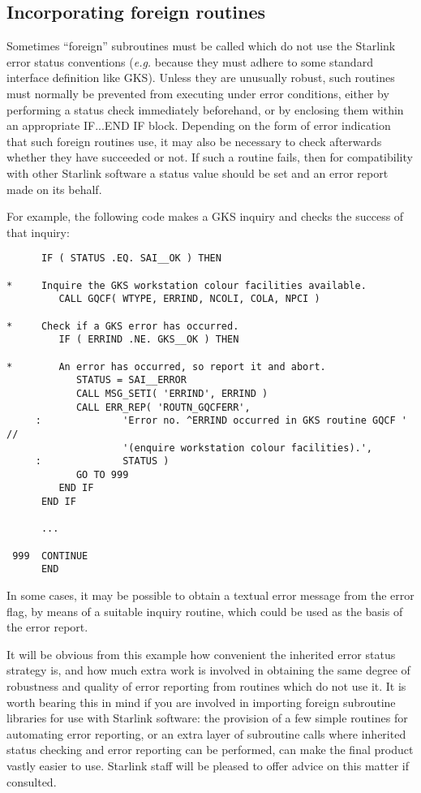 \subsection {Incorporating foreign routines} \label{foreign_sect}

Sometimes ``foreign'' subroutines must be called which do not use the
Starlink error status conventions ({\em e.g.} because they must adhere to some
standard interface definition like GKS).
Unless they are unusually robust, such routines must normally be prevented
from executing under error conditions, either by performing a status check
immediately beforehand, or by enclosing them within an appropriate IF...END 
IF block.
Depending on the form of error indication that such foreign routines use, it 
may also be necessary to check afterwards whether they have succeeded or 
not.
If such a routine fails, then for compatibility with other Starlink
software a status value should be set and an error report made on its
behalf. 

For example, the following code makes a GKS inquiry and checks the 
success of that inquiry:

\begin {small}
\begin{verbatim}
      IF ( STATUS .EQ. SAI__OK ) THEN

*     Inquire the GKS workstation colour facilities available.
         CALL GQCF( WTYPE, ERRIND, NCOLI, COLA, NPCI )

*     Check if a GKS error has occurred.
         IF ( ERRIND .NE. GKS__OK ) THEN

*        An error has occurred, so report it and abort.
            STATUS = SAI__ERROR
            CALL MSG_SETI( 'ERRIND', ERRIND )
            CALL ERR_REP( 'ROUTN_GQCFERR', 
     :              'Error no. ^ERRIND occurred in GKS routine GQCF ' //
                    '(enquire workstation colour facilities).',
     :              STATUS )
            GO TO 999
         END IF
      END IF

      ...

 999  CONTINUE
      END
\end{verbatim}
\end {small}

In some cases, it may be possible to obtain a textual error message from the
error flag, by means of a suitable inquiry routine, which could be used as
the basis of the error report. 

It will be obvious from this example how convenient the inherited error
status strategy is, and how much extra work is involved in obtaining the
same degree of robustness and quality of error reporting from routines
which do not use it. 
It is worth bearing this in mind if you are involved in importing foreign
subroutine libraries for use with Starlink software: the provision of a few
simple routines for automating error reporting, or an extra layer of
subroutine calls where inherited status checking and error reporting can be
performed, can make the final product vastly easier to use. 
Starlink staff will be pleased to offer advice on this matter if consulted.


